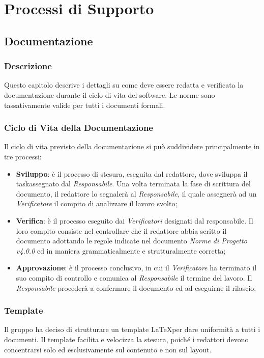 \section{Processi di Supporto}\label{ProcessiSupporto}

\subsection{Documentazione}\label{ProcessiSupporto_Documentazione}

\subsubsection{Descrizione}
Questo capitolo descrive i dettagli su come deve essere redatta e verificata la documentazione durante il ciclo di vita del software. Le norme sono tassativamente valide per tutti i documenti formali.
\subsubsection{Ciclo di Vita della Documentazione}
Il ciclo di vita previsto della documentazione si può suddividere principalmente in tre processi:
\begin{itemize}
	\item \textbf{Sviluppo}: è il processo di stesura, eseguita dal redattore, dove sviluppa il task\glossario assegnato dal \textit{Responsabile}. Una volta terminata la fase di scrittura del documento, il redattore lo segnalerà al \textit{Responsabile}, il quale assegnerà ad un \textit{Verificatore} il compito di analizzare il lavoro svolto;
 	\item \textbf{Verifica}: è il processo eseguito dai \textit{Verificatori} designati dal responsabile. Il loro compito consiste nel controllare che il redattore abbia scritto il documento adottando le regole indicate nel documento \textit{Norme di Progetto v4.0.0} ed in maniera grammaticalmente e strutturalmente corretta;
 	\item \textbf{Approvazione}: è il processo conclusivo, in cui il \textit{Verificatore} ha terminato il suo compito di controllo e comunica al \textit{Responsabile} il termine del lavoro. Il \textit{Responsabile} procederà a confermare il documento ed ad eseguirne il rilascio.
\end{itemize}

\subsubsection{Template}
Il gruppo ha deciso di strutturare un template \LaTeX  per dare uniformità a tutti i documenti. Il template facilita e velocizza la stesura, poiché i redattori devono concentrarsi solo ed esclusivamente sul contenuto e non sul layout.


